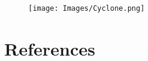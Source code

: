 \documentclass[final,12pt]{elsarticle}
\begin{document}
\begin{figure}[h]
\centering\texttt{[image: Images/Cyclone.png]}
\end{figure}


%
\newpage
%
%

%
%


%
%
%


%

%

\clearpage
\section{References}




\end{document}
